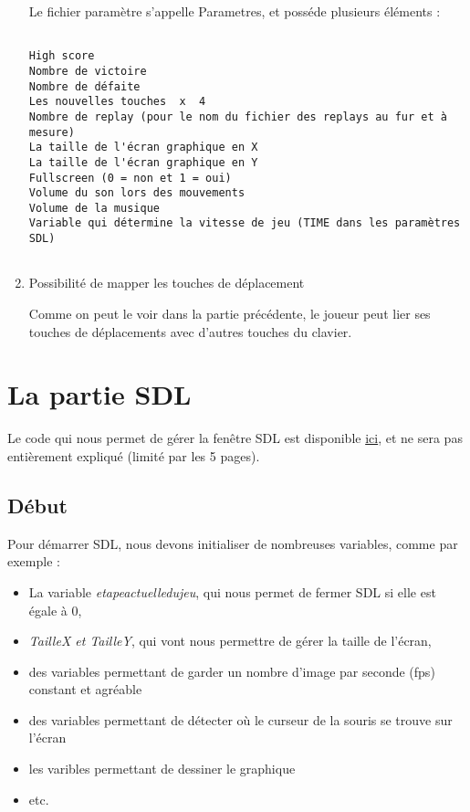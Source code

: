 \documentclass[letter]{article}
\begin{document}
\begin{enumerate}
Le fichier paramètre s'appelle Parametres, et posséde plusieurs éléments :


\begin{verbatim}

High score
Nombre de victoire
Nombre de défaite
Les nouvelles touches  x  4
Nombre de replay (pour le nom du fichier des replays au fur et à mesure)
La taille de l'écran graphique en X
La taille de l'écran graphique en Y
Fullscreen (0 = non et 1 = oui)
Volume du son lors des mouvements
Volume de la musique
Variable qui détermine la vitesse de jeu (TIME dans les paramètres SDL)


\end{verbatim}

\item Possibilité de mapper les touches de déplacement
\label{sec:org0c4679c}

Comme on peut le voir dans la partie précédente, le joueur peut lier ses touches de déplacements avec d'autres touches du clavier.
\end{enumerate}


\section{La partie SDL}
\label{sec:org4f8a4f4}

Le code qui nous permet de gérer la fenêtre SDL est disponible \href{render.c}{ici}, et ne sera pas entièrement expliqué (limité par les 5 pages).

\subsection{Début}
\label{sec:org4cd1378}

Pour démarrer SDL, nous devons initialiser de nombreuses variables, comme par exemple :

\begin{itemize}
\item La variable \emph{etapeactuelledujeu}, qui nous permet de fermer SDL si elle est égale à 0,
\item \emph{TailleX et TailleY}, qui vont nous permettre de gérer la taille de l'écran,
\item des variables permettant de garder un nombre d'image par seconde (fps) constant et agréable
\item des variables permettant de détecter où le curseur de la souris se trouve sur l'écran
\item les varibles permettant de dessiner le graphique
\item etc.
\end{itemize}
\end{document}
